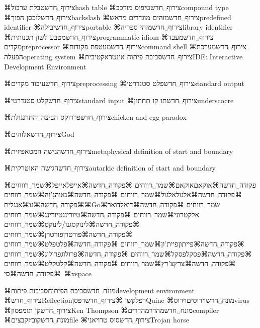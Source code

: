⌘צירוף␣חדש{טבלת ערבול}{hash table}
⌘צירוף␣חדש{טיפוס מורכב}{compound type}
⌘צירוף␣חדש{לוכסן הפוך}{backslash}
⌘צירוף␣חדש{מזהים מוגדרים מראש}{predefined identifier}
⌘צירוף␣חדש{יבילה}{portable}
⌘צירוף␣חדש{מזהי ספריה}{library identifier}
⌘צירוף␣חדש{מטבע לשון תכנותית}{programmatic idiom}
⌘צירוף␣חדש{מעבד מקדים}{preprocessor}
⌘צירוף␣חדש{מעטפת פקודות}{command shell}
⌘צירוף␣חדש{מערכת הפעלה}{operating system}
⌘צירוף␣חדש{סביבת פיתוח אינטראקטיבית}{IDE: Interactive Development Environment}


⌘צירוף␣חדש{עיבוד מקדים}{preprocessing}
⌘צירוף␣חדש{פלט סטנדרטי}{standard output}

⌘צירוף␣חדש{קלט סטנדרטי}{standard input}
⌘צירוף␣חדש{תו קו תחתון}{underscocre}

⌘צירוף␣חדש{פרדוקס הביצה והתרנגולת}{chicken and egg paradox}


⌘צירוף␣חדש{אלוהים}{God}


⌘צירוף␣חדש{הגישה המטאפיזית}{metaphysical definition of start and boundary}

⌘צירוף␣חדש{הגישה האוטרקית}{autarkic definition of start and boundary}

⌘פקודה␣חדשה⌘אוקאם{אוקאם⌘שמר␣רווחים}
⌘פקודה␣חדשה⌘אייפל{אייפל⌘שמר␣רווחים}
⌘פקודה␣חדשה⌘אלגול{אלגול⌘שמר␣רווחים}
⌘פקודה␣חדשה⌘גאוה{גָ'וָה⌘שמר␣רווחים}
⌘פקודה␣חדשה⌘גו{⌘אנגלית{⌘Go}⌘שמר␣רווחים}
⌘פקודה␣חדשה⌘דואל{דואר אלקטרוני⌘שמר␣רווחים}
⌘פקודה␣חדשה⌘טיורינג{טיורינג⌘שמר␣רווחים}
⌘פקודה␣חדשה⌘לינוקס{גנו/לינוקס⌘שמר␣רווחים}
⌘פקודה␣חדשה⌘פורטרן{פורטרן⌘שמר␣רווחים}
⌘פקודה␣חדשה⌘פייתון{פיית'ון⌘שמר␣רווחים}
⌘פקודה␣חדשה⌘פלט{פלט⌘שמר␣רווחים}
⌘פקודה␣חדשה⌘פסקל{פסקל⌘שמר␣רווחים}
⌘פקודה␣חדשה⌘פרולוג{פרולוג⌘שמר␣רווחים}
⌘פקודה␣חדשה⌘צרץ{צ'רץ⌘שמר␣רווחים}
⌘פקודה␣חדשה⌘קלט{קלט⌘שמר␣רווחים}
⌘פקודה␣חדשה⌘סי{\unskip~⌘xspace}

⌘מונח␣חדש{סביבת הפיתוח}{סביבות פיתוח}{development environment}
⌘צירוף␣חדש{Reflection}{רפלקשן}
⌘צירוף␣חדש{דפסן}{Quine}
⌘מונח␣חדש{וירוסים}{וירוס}{virus}
⌘צירוף␣חדש{קן תומפסון}{Ken Thompson}
⌘מונח␣חדש{מהדר}{מהדרים}{compiler}
⌘מונח␣חדש{קובץ}{קבצים}{file}
⌘צירוף␣חדש{סוס טרויאני}{Trojan horse}
